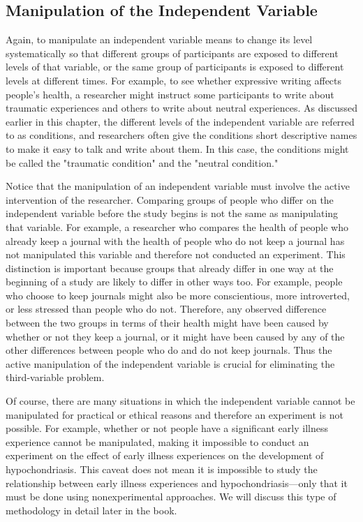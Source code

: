 \subsection{Manipulation of the Independent Variable}
 
Again, to manipulate an independent variable means to change its level systematically so that different groups of participants are exposed to different levels of that variable, or the same group of participants is exposed to different levels at different times. For example, to see whether expressive writing affects people's health, a researcher might instruct some participants to write about traumatic experiences and others to write about neutral experiences. As discussed earlier in this chapter, the different levels of the independent variable are referred to as conditions, and researchers often give the conditions short descriptive names to make it easy to talk and write about them. In this case, the conditions might be called the "traumatic condition" and the "neutral condition."

Notice that the manipulation of an independent variable must involve the active intervention of the researcher. Comparing groups of people who differ on the independent variable before the study begins is not the same as manipulating that variable. For example, a researcher who compares the health of people who already keep a journal with the health of people who do not keep a journal has not manipulated this variable and therefore not conducted an experiment. This distinction is important because groups that already differ in one way at the beginning of a study are likely to differ in other ways too. For example, people who choose to keep journals might also be more conscientious, more introverted, or less stressed than people who do not. Therefore, any observed difference between the two groups in terms of their health might have been caused by whether or not they keep a journal, or it might have been caused by any of the other differences between people who do and do not keep journals. Thus the active manipulation of the independent variable is crucial for eliminating the third-variable problem.
 
Of course, there are many situations in which the independent variable cannot be manipulated for practical or ethical reasons and therefore an experiment is not possible. For example, whether or not people have a significant early illness experience cannot be manipulated, making it impossible to conduct an experiment on the effect of early illness experiences on the development of hypochondriasis. This caveat does not mean it is impossible to study the relationship between early illness experiences and hypochondriasis---only that it must be done using nonexperimental approaches. We will discuss this type of methodology in detail later in the book.
 
